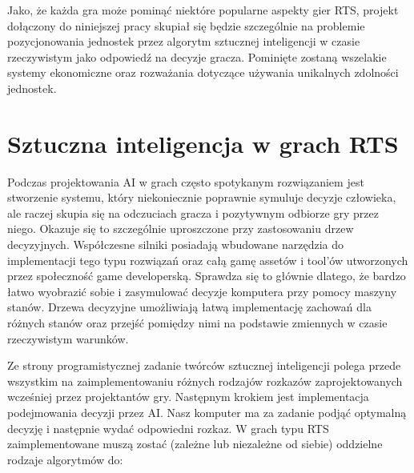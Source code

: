 \documentclass[12pt]{report}
\begin{document}
Jako, że każda gra może pominąć niektóre popularne aspekty gier RTS, projekt dołączony do niniejszej pracy skupiał się będzie szczególnie na problemie pozycjonowania jednostek przez algorytm sztucznej inteligencji w czasie rzeczywistym jako odpowiedź na decyzje gracza. Pominięte zostaną wszelakie systemy ekonomiczne oraz rozważania dotyczące używania unikalnych zdolności jednostek.
\section {Sztuczna inteligencja w grach RTS}
Podczas projektowania AI w grach często spotykanym rozwiązaniem jest stworzenie systemu, który niekoniecznie poprawnie symuluje decyzje człowieka, ale raczej skupia się na odczuciach gracza i pozytywnym odbiorze gry przez niego. Okazuje się to szczególnie uproszczone przy zastosowaniu drzew decyzyjnych. Współczesne silniki posiadają wbudowane narzędzia do implementacji tego typu rozwiązań oraz całą gamę assetów i tool'ów utworzonych przez społeczność game developerską. Sprawdza się to głównie dlatego, że bardzo łatwo wyobrazić sobie i zasymulować decyzje komputera przy pomocy maszyny stanów. Drzewa decyzyjne umożliwiają łatwą implementację zachowań dla różnych stanów oraz przejść pomiędzy nimi na podstawie zmiennych w czasie rzeczywistym warunków.

Ze strony programistycznej zadanie twórców sztucznej inteligencji polega przede wszystkim na zaimplementowaniu różnych rodzajów rozkazów zaprojektowanych wcześniej przez projektantów gry. Następnym krokiem jest implementacja podejmowania decyzji przez AI. Nasz komputer ma za zadanie podjąć optymalną decyzję i następnie wydać odpowiedni rozkaz. W grach typu RTS zaimplementowane muszą zostać (zależne lub niezależne od siebie) oddzielne rodzaje algorytmów do: 
\end{document}
